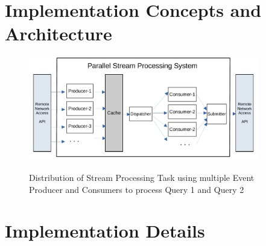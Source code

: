 \section{Implementation Concepts and Architecture}


\begin{figure}[!ht]
    \begin{center}
        \includegraphics[width=0.9\textwidth]{./images/Parallel-Stream-Processing-System}
        \label{fig:parallel-srream-processing}
        \caption{Distribution of Stream Processing Task using multiple Event Producer and Consumers to process Query 1 and Query 2 }
    \end{center}
\end{figure}



\section{Implementation Details}




